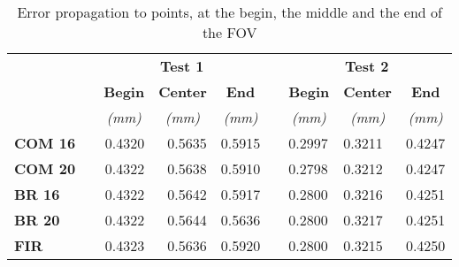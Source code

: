 \begin{table}[b!]
\centering
\begin{tabular}{|l|l|r|r|r|l|l|l|l|}
\cline{1-1} \cline{3-5} \cline{7-9}
\multirow{3}{*}{} &  & \multicolumn{3}{c|}{\textbf{Test 1}}                                                                            &  & \multicolumn{3}{c|}{\textbf{Test 2}}                                                                            \\ \cline{3-5} \cline{7-9} 
                  &  & \multicolumn{1}{c|}{\textbf{Begin}} & \multicolumn{1}{c|}{\textbf{Center}} & \multicolumn{1}{c|}{\textbf{End}}  &  & \multicolumn{1}{c|}{\textbf{Begin}} & \multicolumn{1}{c|}{\textbf{Center}} & \multicolumn{1}{c|}{\textbf{End}}  \\ \cline{3-5} \cline{7-9} 
                  &  & \multicolumn{1}{c|}{\textit{(mm)}}  & \multicolumn{1}{c|}{\textit{(mm)}}   & \multicolumn{1}{c|}{\textit{(mm)}} &  & \multicolumn{1}{c|}{\textit{(mm)}}  & \multicolumn{1}{c|}{\textit{(mm)}}   & \multicolumn{1}{c|}{\textit{(mm)}} \\ \cline{1-1} \cline{3-5} \cline{7-9} 
\textbf{COM 16}   &  & 0.4320                              & 0.5635                               & 0.5915                             &  & 0.2997                              & 0.3211                               & 0.4247                             \\ \cline{1-1} \cline{3-5} \cline{7-9} 
\textbf{COM 20}   &  & 0.4322                              & 0.5638                               & 0.5910                             &  & 0.2798                              & 0.3212                               & 0.4247                             \\ \cline{1-1} \cline{3-5} \cline{7-9} 
\textbf{BR 16}    &  & 0.4322                              & 0.5642                               & 0.5917                             &  & 0.2800                              & 0.3216                               & 0.4251                             \\ \cline{1-1} \cline{3-5} \cline{7-9} 
\textbf{BR 20}    &  & 0.4322                              & 0.5644                               & 0.5636                             &  & 0.2800                              & 0.3217                               & 0.4251                             \\ \cline{1-1} \cline{3-5} \cline{7-9} 
\textbf{FIR}      &  & 0.4323                              & 0.5636                               & 0.5920                             &  & 0.2800                              & 0.3215                               & 0.4250                             \\ \cline{1-1} \cline{3-5} \cline{7-9} 
\end{tabular}
\caption{Error propagation to points, at the begin, the middle and the end of the \acs{FOV}}
\label{tab:exp3-res}
\end{table}